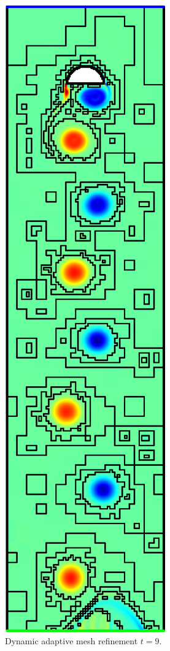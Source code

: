 \documentclass[a4paper]{article}
\begin{document}
\begin{figure}[htbp]
\begin{center}
\includegraphics[angle=90,width=0.8\hsize]{refined2.eps}
\end{center}
\caption{Dynamic adaptive mesh refinement $t=9$.}
\label{refined2}
\end{figure}
\end{document}
